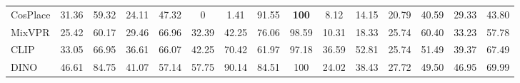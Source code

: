 \begin{table}[H]
{\begin{tabular}{lcccccccccccccc}
      CosPlace                               & 31.36                                                        & 59.32                                                               & 24.11                                                          & 47.32                                                            & 0                                                           & 1.41                                                                                                              & 91.55                                 & \textbf{100}             & 8.12                     & 14.15                    & 20.79                    & 40.59                    & 29.33                    & 43.80                    \\
      MixVPR                                 & 25.42                                                        & 60.17                                                               & 29.46                                                          & 66.96                                                            & 32.39                                                       & 42.25                                                                                                             & 76.06                                 & 98.59                    & 10.31                    & 18.33                    & 25.74                    & 60.40                    & 33.23                    & 57.78                    \\ \hline
      CLIP                                   & 33.05                                                        & 66.95                                                               & 36.61                                                          & 66.07                                                            & 42.25                                                       & 70.42                                                                                                             & 61.97                                 & 97.18                    & 36.59                    & 52.81                    & 25.74                    & 51.49                    & 39.37                    & 67.49                    \\
      DINO                                   & 46.61                                                        & 84.75                                                               & 41.07                                                          & 57.14                                                            & 57.75                                                       & 90.14                                                                                                             & 84.51                                 & 100                      & 24.02                    & 38.43                    & 27.72                    & 49.50                    & 46.95                    & 69.99                    \\

\end{tabular}}
\end{table}
